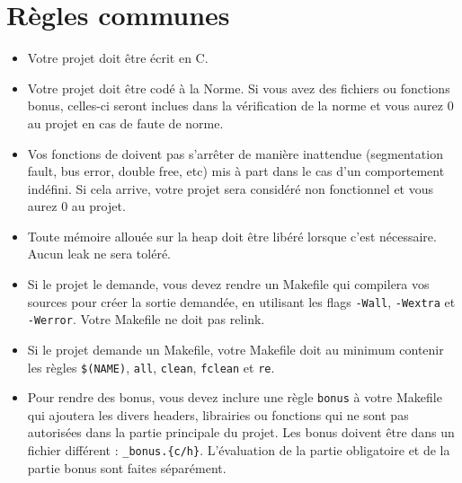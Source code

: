 
\chapter{Règles communes}
    \begin{itemize}

      \item Votre projet doit être écrit en C.

      \item Votre projet doit être codé à la Norme. Si vous avez des fichiers ou
        fonctions bonus, celles-ci seront inclues dans la vérification de la norme
        et vous aurez 0 au projet en cas de faute de norme.

      \item Vos fonctions de doivent pas s'arrêter de manière inattendue (segmentation
      fault, bus error, double free, etc) mis à part dans le cas d'un comportement
      indéfini. Si cela arrive, votre projet sera considéré non fonctionnel et vous 
      aurez 0 au projet.

      \item Toute mémoire allouée sur la heap doit être libéré lorsque c'est nécessaire.
        Aucun leak ne sera toléré.

      \item Si le projet le demande, vous devez rendre un Makefile qui compilera vos 
        sources pour créer la sortie demandée, en utilisant les flags \texttt{-Wall},
        \texttt{-Wextra} et \texttt{-Werror}. Votre Makefile ne doit pas relink.

      \item Si le projet demande un Makefile, votre Makefile doit au minimum
        contenir les règles \texttt{\$(NAME)}, \texttt{all}, \texttt{clean},
        \texttt{fclean} et \texttt{re}.

      \item Pour rendre des bonus, vous devez inclure une règle \texttt{bonus} à votre
        Makefile qui ajoutera les divers headers, librairies ou fonctions qui ne sont
        pas autorisées dans la partie principale du projet. Les bonus doivent être dans 
        un fichier différent :  \texttt{\*\_bonus.\{c/h\}}. L'évaluation de la partie 
        obligatoire et de la partie bonus sont faites séparément.


\end{itemize}
